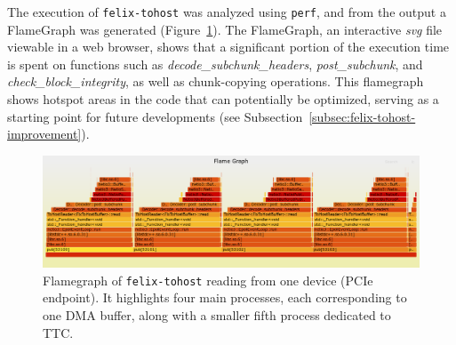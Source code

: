 The execution of \texttt{felix-tohost} was analyzed using \texttt{perf}, and from the output a FlameGraph \cite{flamegraph} was generated (Figure~\ref{fig:felix-tohost-flamegraph}). The FlameGraph, an interactive \emph{svg} file viewable in a web browser, shows that a significant portion of the execution time is spent on functions such as \emph{decode\_subchunk\_headers}, \emph{post\_subchunk}, and \emph{check\_block\_integrity}, as well as chunk-copying operations. This flamegraph shows hotspot areas in the code that can potentially be optimized, serving as a starting point for future developments (see Subsection~\ref{subsec:felix-tohost-improvement}).

\begin{figure}[htbp]
\centering
\includegraphics[width=\textwidth]{images/results/flamegraph.png}
\caption[Flamegraph of felix-tohost]{Flamegraph of \texttt{felix-tohost} reading from one device (PCIe endpoint). It highlights four main processes, each corresponding to one \acs{DMA} buffer, along with a smaller fifth process dedicated to \acs{TTC}.}\label{fig:felix-tohost-flamegraph}
\end{figure}